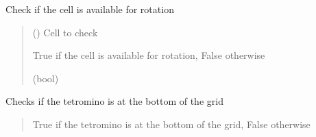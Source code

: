 \documentclass[letterpaper,10pt,english]{sphinxmanual}
\begin{document}
\begin{fulllineitems}
\begin{fulllineitems}
\label{\detokenize{tetrominos:tetrominos.Tetromino.TAG}}
\pysigstartsignatures
{}
\pysigstopsignatures
\end{fulllineitems}


\begin{fulllineitems}
\label{\detokenize{tetrominos:tetrominos.Tetromino.check_cell_available_for_rotation}}
\pysigstartsignatures
{}
\pysigstopsignatures
\sphinxAtStartPar
Check if the cell is available for rotation
\begin{quote}\begin{description}
\sphinxAtStartPar
{} (\sphinxstyleliteralemphasis{\sphinxupquote{{[}}}\sphinxstyleliteralemphasis{\sphinxupquote{{]}}}) \textendash{} Cell to check

\sphinxAtStartPar
True if the cell is available for rotation, False otherwise

\sphinxAtStartPar
(bool)

\end{description}\end{quote}

\end{fulllineitems}


\begin{fulllineitems}
\label{\detokenize{tetrominos:tetrominos.Tetromino.check_down}}
\pysigstartsignatures
{}
\pysigstopsignatures
\sphinxAtStartPar
Checks if the tetromino is at the bottom of the grid
\begin{quote}\begin{description}
\sphinxAtStartPar
True if the tetromino is at the bottom of the grid, False otherwise


\end{description}
\end{quote}
\end{fulllineitems}
\end{fulllineitems}
\end{document}
